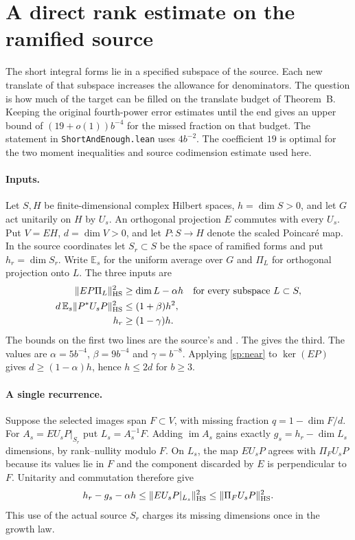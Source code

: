 \section{A direct rank estimate on the ramified source}
\label{sec:spectral-spanning}

The short integral forms lie in a specified subspace of the source.
Each new translate of that subspace increases the allowance for denominators.
The question is how much of the target can be filled on the translate budget
of Theorem~B. Keeping the original fourth-power error estimates until the
end gives an upper bound of $(19+o(1))b^{-4}$ for the missed fraction on that budget.
The statement in \texttt{ShortAndEnough.lean} uses $4b^{-2}$.
The coefficient $19$ is optimal for the two moment inequalities and source
codimension estimate used here.

\paragraph{Inputs.}
Let $S,H$ be finite-dimensional complex Hilbert spaces, $h=\dim S>0$,
and let $G$ act unitarily on $H$ by $U_s$. An orthogonal projection $E$
commutes with every $U_s$. Put $V=EH$, $d=\dim V>0$, and let $P:S\to H$
denote the scaled Poincar\'e map. In the source coordinates let $S_r\subset S$
be the space of ramified forms and put $h_r=\dim S_r$. Write
$\mathbb E_s$ for the uniform average over $G$ and $\Pi_L$ for orthogonal
projection onto $L$. The three inputs are
\begin{align}
 \|EP\Pi_L\|_{\rm HS}^2&\ge\dim L-\alpha h
      &&\text{for every subspace }L\subset S,\label{sp:near}\\
 d\,\mathbb E_s\|P^*U_sP\|_{\rm HS}^2&\le(1+\beta)h^2,\label{sp:mom}\\
 h_r&\ge(1-\gamma)h.\label{sp:ram}
\end{align}
The bounds on the first two lines are the source's  and . The  gives the third. The values are $\alpha=5b^{-4}$, $\beta=9b^{-4}$ and $\gamma=b^{-8}$.
Applying \eqref{sp:near} to $\ker(EP)$ gives
$d\ge(1-\alpha)h$, hence $h\le2d$ for $b\ge3$.

\paragraph{A single recurrence.}
Suppose the selected images span $F\subset V$, with missing fraction
$q=1-\dim F/d$. For $A_s=EU_sP|_{S_r}$ put $L_s=A_s^{-1}F$.
Adding $\operatorname{im}A_s$ gains exactly $g_s=h_r-\dim L_s$
dimensions, by rank--nullity modulo $F$. On $L_s$, the map $EU_sP$
agrees with $\Pi_F U_sP$ because its values lie in $F$ and the component
discarded by $E$ is perpendicular to $F$. Unitarity and commutation
therefore give
\[
 h_r-g_s-\alpha h
 \le \|EU_sP|_{L_s}\|_{\rm HS}^2
 \le \|\Pi_F U_sP\|_{\rm HS}^2 .
\]
This use of the actual source $S_r$ charges its missing dimensions once
in the growth law.

